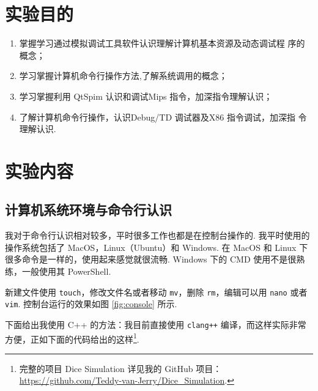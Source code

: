 \documentclass[11pt]{SEU-Digital-Report}
\begin{document}
  \exptitlepage

  \tableofcontents
  \newpage

  \section{实验目的}
        
    \begin{enumerate}
        \item 掌握学习通过模拟调试工具软件认识理解计算机基本资源及动态调试程
        序的概念；
        \item 学习掌握计算机命令行操作方法,了解系统调用的概念；
        \item 学习掌握利用 QtSpim 认识和调试Mips 指令，加深指令理解认识；
        \item 了解计算机命令行操作，认识Debug/TD 调试器及X86 指令调试，加深指
        令理解认识.    \cite{guide}
    \end{enumerate}

  \section{实验内容}

    \subsection{计算机系统环境与命令行认识}

      我对于命令行认识相对较多，平时很多工作也都是在控制台操作的.
      我平时使用的操作系统包括了 MacOS，Linux（Ubuntu）和 Windows.    
      在 MacOS 和 Linux 下很多命令是一样的，使用起来感觉就很流畅.
      Windows 下的 CMD 使用不是很熟练，一般使用其 PowerShell.

      新建文件使用 \texttt{touch}，修改文件名或者移动 \texttt{mv}，删除 \texttt{rm}，编辑可以用 \texttt{nano} 或者 \texttt{vim}.    
      控制台运行的效果如图 \ref{fig:console} 所示.

      下面给出我使用 C++ 的方法：我目前直接使用 \texttt{clang++} 编译，而这样实际非常方便，正如下面的代码给出的这样\footnote{
        完整的项目 Dice Simulation 详见我的 GitHub 项目：\url{https://github.com/Teddy-van-Jerry/Dice_Simulation}.
      }.    
\end{document}
